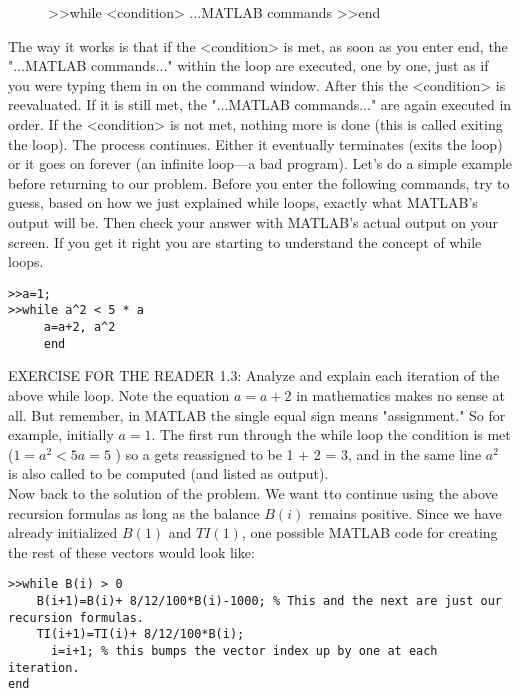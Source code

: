 \documentclass[../main.tex]{subfiles}
\begin{document}
\begin{figure}[H]
\centering
\begin{boxedverbatim}
>>while   <condition>
...MATLAB commands
>>end
\end{boxedverbatim}
\end{figure}


The way it works is that if the <condition> is met, as soon as you enter end, the
"...MATLAB commands..." within the loop are executed, one by one, just as if
you were typing them in on the command window. After this the <condition> is
reevaluated. If it is still met, the "...MATLAB commands..." are again executed
in order. If the <condition> is not met, nothing more is done (this is called exiting
the loop). The process continues. Either it eventually terminates (exits the loop)
or it goes on forever (an infinite loop—a bad program). Let's do a simple example before returning to our problem. Before you enter the following
commands, try to guess, based on how we just explained while loops, exactly what
MATLAB's output will be. Then check your answer with MATLAB's actual
output on your screen. If you get it right you are starting to understand the concept
of while loops. 

\begin{verbatim}
>>a=1;
>>while a^2 < 5 * a
	 a=a+2, a^2
     end 
\end{verbatim}

EXERCISE FOR THE READER 1.3: Analyze and explain each iteration of the
above while loop. Note the equation $a=a+2$ in mathematics makes no sense at
all. But remember, in MATLAB the single equal sign means "assignment." So
for example, initially $a = 1$. The first run through the while loop the condition is
met ($1 = a^2 < 5a = 5$ ) so a gets reassigned to be 1 + 2 = 3, and in the same line $a^2$
is also called to be computed (and listed as output).\\

Now back to the solution of the problem. We want tto continue using the above
recursion formulas as long as the balance  $B(i)$ remains positive. Since we have
already initialized $B(1)$ and $TI(1)$, one possible MATLAB code for creating the
rest of these vectors would look like: 

\begin{verbatim}
>>while B(i) > 0
	B(i+1)=B(i)+ 8/12/100*B(i)-1000; % This and the next are just our recursion formulas. 
	TI(i+1)=TI(i)+ 8/12/100*B(i);
	  i=i+1; % this bumps the vector index up by one at each  iteration.
end
\end{verbatim}
\end{document}
